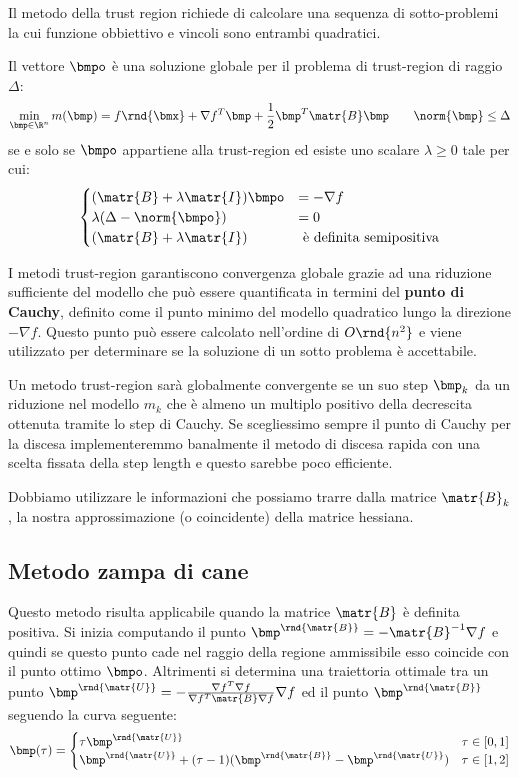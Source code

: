 \documentclass[\main/main.tex]{subfiles}
\begin{document}
Il metodo della trust region richiede di calcolare una sequenza di sotto-problemi la cui funzione obbiettivo e vincoli sono entrambi quadratici.

\begin{theorem}
    Il vettore \(\bmpo \) è una soluzione globale per il problema di trust-region di raggio \(\Delta\):
    \[
        \min_{\bmp \in \R^n} m(\bmp) = f\rnd{\bmx} + \nabla f^T \bmp + \frac{1}{2}\bmp^T \matr{B}\bmp \qquad \norm{\bmp} \leq \Delta
    \]    se e solo se \(\bmpo \) appartiene alla trust-region ed esiste uno scalare \(\lambda\geq 0\) tale per cui:
    \[
        \begin{cases}
            (\matr{B}+\lambda \matr{I})\bmpo             & = -\nabla f                     \\
            \lambda(\Delta - \norm{\bmpo}) & = 0                             \\
            (\matr{B} + \lambda \matr{I})                 & \text{ è definita semipositiva}
        \end{cases}
    \]
\end{theorem}

I metodi trust-region garantiscono convergenza globale grazie ad una riduzione sufficiente del modello che può essere quantificata in termini del \textbf{punto di Cauchy}, definito come il punto minimo del modello quadratico lungo la direzione \(-\nabla f\). Questo punto può essere calcolato nell'ordine di \(O\rnd{n^2}\) e viene utilizzato per determinare se la soluzione di un sotto problema è accettabile.

Un metodo trust-region sarà globalmente convergente se un suo step \(\bmp_k\) da un riduzione nel modello \(m_k\) che è almeno un multiplo positivo della decrescita ottenuta tramite lo step di Cauchy. Se scegliessimo sempre il punto di Cauchy per la discesa implementeremmo banalmente il metodo di discesa rapida con una scelta fissata della step length e questo sarebbe poco efficiente.

Dobbiamo utilizzare le informazioni che possiamo trarre dalla matrice \(\matr{B}_k\), la nostra approssimazione (o coincidente) della matrice hessiana.

\subsection{Metodo zampa di cane}
Questo metodo risulta applicabile quando la matrice \(\matr{B}\) è definita positiva. Si inizia computando il punto \(\bmp^{\rnd{\matr{B}}} = -\matr{B}^{-1}\nabla f\) e quindi se questo punto cade nel raggio della regione ammissibile esso coincide con il punto ottimo \(\bmpo \). Altrimenti si determina una traiettoria ottimale tra un punto \(\bmp^{\rnd{\matr{U}}} = -\frac{\nabla f^T \nabla f}{\nabla f^T \matr{B} \nabla f} \nabla f\) ed il punto \(\bmp^{\rnd{\matr{B}}}\) seguendo la curva seguente:
\[
    \bmp(\tau) = \begin{cases}
        \tau \bmp^{\rnd{\matr{U}}}                                 & \tau \in [0,1] \\
        \bmp^{\rnd{\matr{U}}} + (\tau -1)(\bmp^{\rnd{\matr{B}}} - \bmp^{\rnd{\matr{U}}}) & \tau \in [1,2]
    \end{cases}
\]
\end{document}
